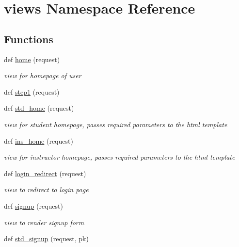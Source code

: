 \hypertarget{namespaceviews}{}\section{views Namespace Reference}
\label{namespaceviews}
\subsection*{Functions}
\begin{DoxyCompactItemize}
\item 
def \hyperlink{namespaceviews_ac1dd776953420b588d3b68a6cf25a3c7}{home} (request)
\begin{DoxyCompactList}\small\item\em view for homepage of user \end{DoxyCompactList}\item 
def \hyperlink{namespaceviews_a24e0dd35384543e7c1e1abb1277addfe}{step1} (request)
\item 
def \hyperlink{namespaceviews_a2f05da018235dfd980cc7fb8f9ba2fbf}{std\+\_\+home} (request)
\begin{DoxyCompactList}\small\item\em view for student homepage, passes required parameters to the html template \end{DoxyCompactList}\item 
def \hyperlink{namespaceviews_a0542df0ad95e33bb39d27912fd8ff346}{ins\+\_\+home} (request)
\begin{DoxyCompactList}\small\item\em view for instructor homepage, passes required parameters to the html template \end{DoxyCompactList}\item 
def \hyperlink{namespaceviews_ab48a1123871774e1d5fe270e8d56368d}{login\+\_\+redirect} (request)
\begin{DoxyCompactList}\small\item\em view to redirect to login page \end{DoxyCompactList}\item 
def \hyperlink{namespaceviews_a1d82beca5d23d3b7f834aa720a4fe0fe}{signup} (request)
\begin{DoxyCompactList}\small\item\em view to render signup form \end{DoxyCompactList}\item 
def \hyperlink{namespaceviews_acdc8e4e89521476a3cb418e81f3bc4c2}{std\+\_\+signup} (request, pk)

\end{DoxyCompactItemize}
